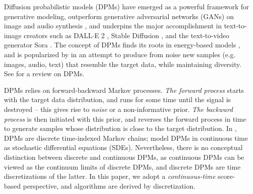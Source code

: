\documentclass[letterpaper,10pt,reqno]{amsart}
\numberwithin{equation}{section}
\begin{document}
\quad 
Diffusion probabilistic models (DPMs) have emerged as a %
powerful framework for generative modeling, outperform generative adversarial networks (GANs) on image and audio synthesis \cite{Dh21, Kong21},
and underpins the major accomplishment in text-to-image creators such as 
DALL$\cdot$E 2 \cite{Ramesh22}, Stable Diffusion \cite{Rombach22},
and the text-to-video generator Sora \cite{Sora}.
The concept of DPMs finds its roots in energy-based models \cite{Sohl15},
and is popularized by  \cite{Ho20, Song19, Song20}
in an attempt to produce from noise new samples 
(e.g. images, audio, text)
that resemble the target data, while maintaining diversity.
See \cite{chen2024overview, Tutorial, Yang23} for a review on DPMs.

\quad DPMs relies on forward-backward Markov processes.
{\it The forward process} starts with the target data distribution, 
and runs for some time until the signal is destroyed --
this gives rise to {\em noise} or a non-informative prior. 
{\it The backward process} is then initiated with this prior, 
and reverses the forward process in time to generate samples
whose distribution is close to the target distribution.
In \cite{Austin21, Ho20, Song19}, DPMs are discrete time-indexed Markov chains;
\cite{Chen23, Song21, Song20} model DPMs in continuous time as 
stochastic differential equations (SDEs).
Nevertheless,
there is no conceptual distinction between discrete and continuous DPMs,
as continuous DPMs can be viewed as the continuum limits of discrete DPMs,
and discrete DPMs are time discretizations of the latter.
In this paper, we adopt a {\em continuous-time} score-based perspective,
and algorithms are derived by discretization.
\end{document}
